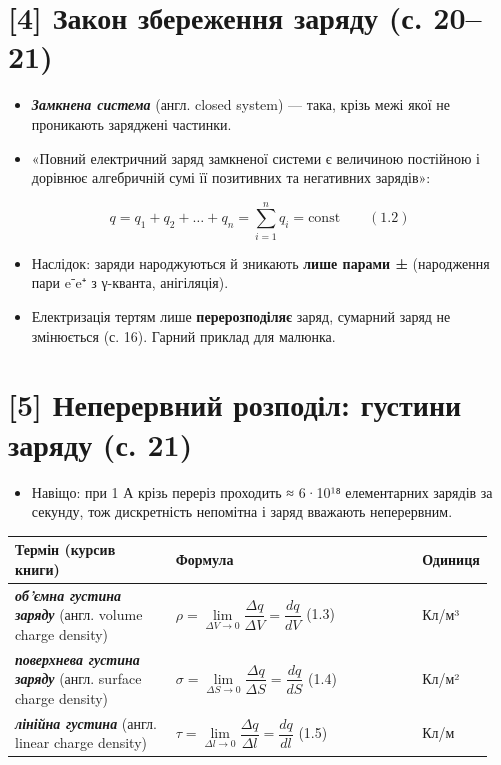 \documentclass[11pt,a4paper,oneside]{book}
\begin{document}
\section*{[4] Закон збереження заряду (с. 20–21)}

\begin{itemize}
\item \textbf{\textit{Замкнена система}} (англ. closed system) — така, крізь межі якої не проникають заряджені частинки.
\item «Повний електричний заряд замкненої системи є величиною постійною і дорівнює алгебричній сумі її позитивних та негативних зарядів»:
\end{itemize}

\[q = q_1 + q_2 + \ldots + q_n = \sum_{i=1}^{n} q_i = \text{const} \qquad (1.2)\]

\begin{itemize}
\item Наслідок: заряди народжуються й зникають \textbf{лише парами ±} (народження пари e⁻e⁺ з γ-кванта, анігіляція).
\item Електризація тертям лише \textbf{перерозподіляє} заряд, сумарний заряд не змінюється (с. 16). Гарний приклад для малюнка.
\end{itemize}

\section*{[5] Неперервний розподіл: густини заряду (с. 21)}

\begin{itemize}
\item Навіщо: при 1 А крізь переріз проходить ≈ 6·10¹⁸ елементарних зарядів за секунду, тож дискретність непомітна і заряд вважають неперервним.
\end{itemize}

{\small
\begin{longtable}{>{\raggedright\arraybackslash}p{0.341\linewidth}>{\raggedright\arraybackslash}p{0.520\linewidth}>{\raggedright\arraybackslash}p{0.091\linewidth}}
\toprule
\textbf{Термін (курсив книги)} & \textbf{Формула} & \textbf{Одиниця} \\
\midrule
\endhead
\textbf{\textit{об'ємна густина заряду}} (англ. volume charge density) & $\rho = \lim\limits_{\Delta V\to0}\dfrac{\Delta q}{\Delta V} = \dfrac{dq}{dV}$ (1.3) & Кл/м³ \\
\textbf{\textit{поверхнева густина заряду}} (англ. surface charge density) & $\sigma = \lim\limits_{\Delta S\to0}\dfrac{\Delta q}{\Delta S} = \dfrac{dq}{dS}$ (1.4) & Кл/м² \\
\textbf{\textit{лінійна густина}} (англ. linear charge density) & $\tau = \lim\limits_{\Delta l\to0}\dfrac{\Delta q}{\Delta l} = \dfrac{dq}{dl}$ (1.5) & Кл/м \\
\bottomrule
\end{longtable}
}
\end{document}
